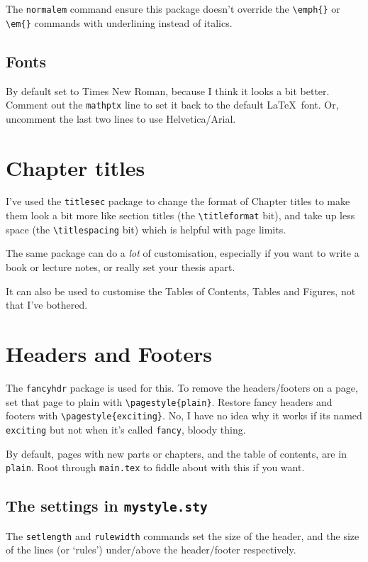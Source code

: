 \documentclass[../main]{subfiles}
\begin{document}
The \texttt{normalem} command ensure this package doesn't override the \verb|\emph{}| or \verb|\em{}| commands with underlining instead of italics.

\subsection{Fonts}
By default set to Times New Roman, because I think it looks a bit better. Comment out the \texttt{mathptx} line to set it back to the default \LaTeX\ font. Or, uncomment the last two lines to use Helvetica/Arial.


\section{Chapter titles}

I've used the \texttt{titlesec} package to change the format of Chapter titles to make them look a bit more like section titles (the \verb|\titleformat| bit), and take up less space (the \verb|\titlespacing| bit) which is helpful with page limits.

The same package can do a \textit{lot} of customisation, especially if you want to write a book or lecture notes, or really set your thesis apart.

It can also be used to customise the Tables of Contents, Tables and Figures, not that I've bothered.

\section{Headers and Footers}

The \texttt{fancyhdr} package is used for this. To remove the headers/footers on a page, set that page to plain with \verb|\pagestyle{plain}|. Restore fancy headers and footers with \verb|\pagestyle{exciting}|. No, I have no idea why it works if its named \texttt{exciting} but not when it's called \texttt{fancy}, bloody thing.

By default, pages with new parts or chapters, and the table of contents, are in \texttt{plain}. Root through \texttt{main.tex} to fiddle about with this if you want.

\subsection{The settings in \texttt{mystyle.sty}}

The \texttt{setlength} and \texttt{rulewidth} commands set the size of the header, and the size of the lines (or `rules') under/above the header/footer respectively.
\end{document}
